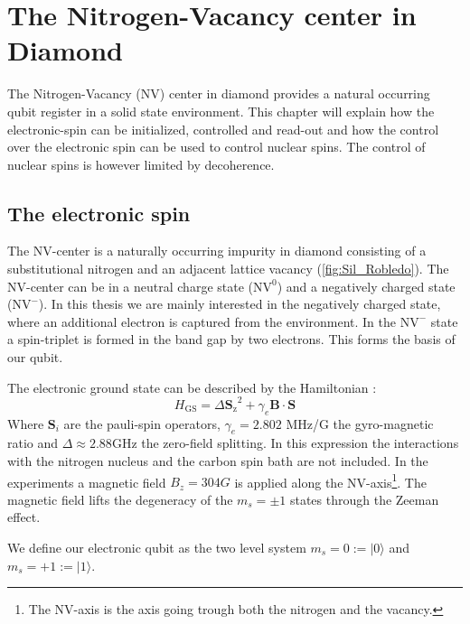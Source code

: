 \chapter{The Nitrogen-Vacancy center in Diamond}
The Nitrogen-Vacancy (NV) center in diamond provides a natural occurring qubit register in a solid state environment.
This chapter will explain how the electronic-spin can be initialized, controlled and read-out and how the control over the electronic spin can be used to control nuclear spins.
The control of nuclear spins is however limited by decoherence.

\section{The electronic spin}
The NV-center is a naturally occurring impurity in diamond consisting of a substitutional nitrogen and an adjacent lattice vacancy (\cref{fig:Sil_Robledo}). %
The NV-center can be in a neutral charge state ($\mathrm{NV}^0$) and a negatively charged state ($\mathrm{NV}^-$).
In this thesis we are mainly interested in the negatively charged state, where an additional electron is captured from the environment.
In the $\mathrm{NV}^-$ state a spin-triplet is formed in the band gap by two electrons.
This forms the basis of our qubit.

The electronic ground state can be described by the Hamiltonian \citep{Bernien2014Control}:
 \begin{equation}
H_\mathrm{GS} = \Delta {\bm{S}_\mathrm{z}}^2 + \gamma_e \bm{B} \cdot \bm{S}
\end{equation}
Where $\bm{S}_i$ are the pauli-spin operators,  $\gamma_e  = 2.802$ MHz/G  the gyro-magnetic ratio and $\Delta \approx 2.88 \mathrm{GHz}$ the zero-field splitting.
In this expression the interactions with the nitrogen nucleus and the carbon spin bath are not included.
In the experiments a magnetic field $B_z = 304G$ is applied along the NV-axis\footnote{The NV-axis is the axis going trough both the nitrogen and the vacancy. }.
The magnetic field lifts the degeneracy of the $m_s = \pm 1$ states through the Zeeman effect.

We define our electronic qubit  as the two level system  $m_s=0:=|0\rangle$ and $m_s = +1 := |1\rangle$.

